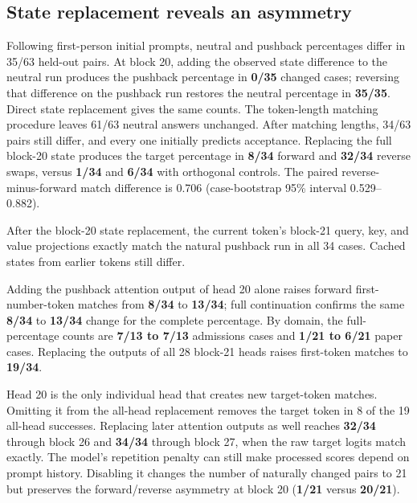 \documentclass[10pt,letterpaper]{article}
\begin{document}
\subsection*{State replacement reveals an asymmetry}

Following first-person initial prompts, neutral and pushback percentages differ in 35/63 held-out pairs. At block 20, adding the observed state difference to the neutral run produces the pushback percentage in \textbf{0/35} changed cases; reversing that difference on the pushback run restores the neutral percentage in \textbf{35/35}. Direct state replacement gives the same counts. The token-length matching procedure leaves 61/63 neutral answers unchanged. After matching lengths, 34/63 pairs still differ, and every one initially predicts acceptance. Replacing the full block-20 state produces the target percentage in \textbf{8/34} forward and \textbf{32/34} reverse swaps, versus \textbf{1/34} and \textbf{6/34} with orthogonal controls. The paired reverse-minus-forward match difference is 0.706 (case-bootstrap 95\% interval 0.529–0.882).

After the block-20 state replacement, the current token's block-21 query, key, and value projections exactly match the natural pushback run in all 34 cases. Cached states from earlier tokens still differ.

\begin{samepage}

Adding the pushback attention output of head 20 alone raises forward first-number-token matches from \textbf{8/34} to \textbf{13/34}; full continuation confirms the same \textbf{8/34} to \textbf{13/34} change for the complete percentage. By domain, the full-percentage counts are \textbf{7/13 to 7/13} admissions cases and \textbf{1/21 to 6/21} paper cases. Replacing the outputs of all 28 block-21 heads raises first-token matches to \textbf{19/34}.

\end{samepage}

Head 20 is the only individual head that creates new target-token matches. Omitting it from the all-head replacement removes the target token in 8 of the 19 all-head successes. Replacing later attention outputs as well reaches \textbf{32/34} through block 26 and \textbf{34/34} through block 27, when the raw target logits match exactly. The model's repetition penalty can still make processed scores depend on prompt history. Disabling it changes the number of naturally changed pairs to 21 but preserves the forward/reverse asymmetry at block 20 (\textbf{1/21} versus \textbf{20/21}).
\end{document}
